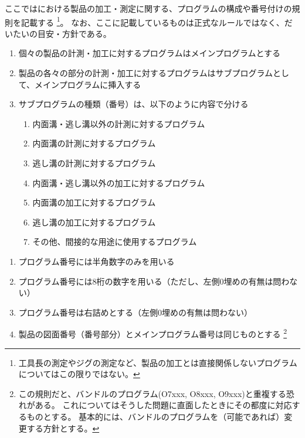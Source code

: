 
ここでは\DMname における製品の加工・測定に関する、プログラムの構成や番号付けの規則を記載する
\footnote{工具長の測定やジグの測定など、製品の加工とは直接関係しないプログラムについてはこの限りではない。}。
なお、ここに記載しているものは正式なルールではなく、だいたいの目安・方針である。


\begin{enumerate}
\item 個々の製品の計測・加工に対するプログラムはメインプログラムとする
\item 製品の各々の部分の計測・加工に対するプログラムはサブプログラムとして、メインプログラムに挿入する
\item サブプログラムの種類（番号）は、以下のように内容で分ける
  \begin{enumerate}
  \item 内面溝・逃し溝以外の計測に対するプログラム
  \item 内面溝の計測に対するプログラム
  \item 逃し溝の計測に対するプログラム
  \item 内面溝・逃し溝以外の加工に対するプログラム
  \item 内面溝の加工に対するプログラム
  \item 逃し溝の加工に対するプログラム
  \item その他、間接的な用途に使用するプログラム
  \end{enumerate}
\end{enumerate}



\clearpage
\begin{enumerate}
\item プログラム番号には半角数字のみを用いる
\item プログラム番号には8桁の数字を用いる（ただし、左側0埋めの有無は問わない）
\item プログラム番号は右詰めとする（左側0埋めの有無は問わない）
\item 製品の図面番号（番号部分）とメインプログラム番号は同じものとする
\footnote{この規則だと、バンドルのプログラム(O7xxx, O8xxx, O9xxx)と重複する恐れがある。
これについてはそうした問題に直面したときにその都度に対応するものとする。
基本的には、バンドルのプログラムを（可能であれば）変更する方針とする。}
\end{enumerate}



